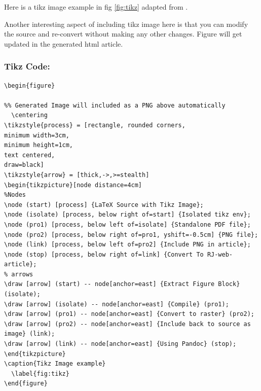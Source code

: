 Here is a tikz image example in fig \ref{fig:tikz} adapted from \citep{casflow}.


Another interesting aspect of including tikz image here is that you can modify the
source and re-convert without making any other changes. Figure will get updated
in the generated html article.

\subsubsection{Tikz Code:}
\begin{verbatim}
\begin{figure}

%% Generated Image will included as a PNG above automatically
  \centering
\tikzstyle{process} = [rectangle, rounded corners,
minimum width=3cm, 
minimum height=1cm,
text centered, 
draw=black]
\tikzstyle{arrow} = [thick,->,>=stealth]
\begin{tikzpicture}[node distance=4cm]
%Nodes
\node (start) [process] {LaTeX Source with Tikz Image};
\node (isolate) [process, below right of=start] {Isolated tikz env};
\node (pro1) [process, below left of=isolate] {Standalone PDF file};
\node (pro2) [process, below right of=pro1, yshift=-0.5cm] {PNG file};
\node (link) [process, below left of=pro2] {Include PNG in article};
\node (stop) [process, below right of=link] {Convert To RJ-web-article};
% arrows
\draw [arrow] (start) -- node[anchor=east] {Extract Figure Block} (isolate);
\draw [arrow] (isolate) -- node[anchor=east] {Compile} (pro1);
\draw [arrow] (pro1) -- node[anchor=east] {Convert to raster} (pro2);
\draw [arrow] (pro2) -- node[anchor=east] {Include back to source as image} (link);
\draw [arrow] (link) -- node[anchor=east] {Using Pandoc} (stop);
\end{tikzpicture}
\caption{Tikz Image example}
  \label{fig:tikz}
\end{figure}

\end{verbatim}

